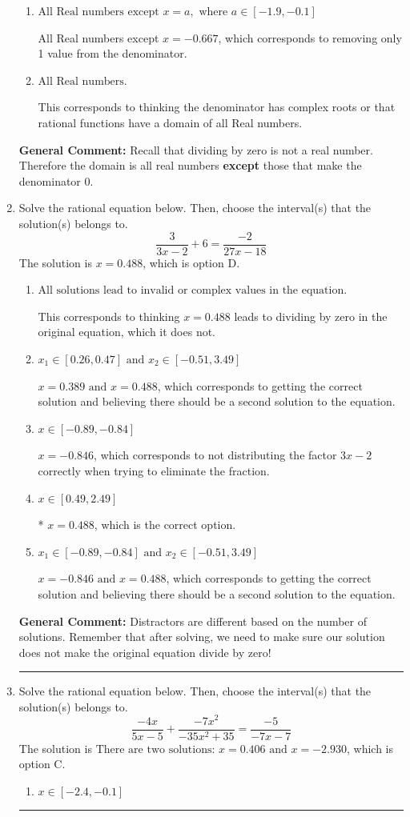 \documentclass{extbook}[14pt]
\newcommand{\litem}[1]{\item #1

\rule{\textwidth}{0.4pt}}
\begin{document}
\begin{enumerate}
{\begin{enumerate}[label=\Alph*.]
All Real numbers except $x = -24.000$, which corresponds to removing a distractor value from the denominator.
\item \( \text{All Real numbers except } x = a, \text{ where } a \in [-1.9, -0.1] \)

All Real numbers except $x = -0.667$, which corresponds to removing only 1 value from the denominator.
\item \( \text{All Real numbers.} \)

This corresponds to thinking the denominator has complex roots or that rational functions have a domain of all Real numbers.
\end{enumerate}

\textbf{General Comment:} Recall that dividing by zero is not a real number. Therefore the domain is all real numbers \textbf{except} those that make the denominator 0.
}
\litem{
Solve the rational equation below. Then, choose the interval(s) that the solution(s) belongs to.
\[ \frac{3}{3x -2} + 6 = \frac{-2}{27x -18} \]The solution is \( x = 0.488 \), which is option D.\begin{enumerate}[label=\Alph*.]
\item \( \text{All solutions lead to invalid or complex values in the equation.} \)

This corresponds to thinking $x = 0.488$ leads to dividing by zero in the original equation, which it does not.
\item \( x_1 \in [0.26, 0.47] \text{ and } x_2 \in [-0.51,3.49] \)

$x = 0.389 \text{ and } x = 0.488$, which corresponds to getting the correct solution and believing there should be a second solution to the equation.
\item \( x \in [-0.89,-0.84] \)

$x = -0.846$, which corresponds to not distributing the factor $3x -2$ correctly when trying to eliminate the fraction.
\item \( x \in [0.49,2.49] \)

* $x = 0.488$, which is the correct option.
\item \( x_1 \in [-0.89, -0.84] \text{ and } x_2 \in [-0.51,3.49] \)

$x = -0.846 \text{ and } x = 0.488$, which corresponds to getting the correct solution and believing there should be a second solution to the equation.
\end{enumerate}

\textbf{General Comment:} Distractors are different based on the number of solutions. Remember that after solving, we need to make sure our solution does not make the original equation divide by zero!
}
\litem{
Solve the rational equation below. Then, choose the interval(s) that the solution(s) belongs to.
\[ \frac{-4x}{5x -5} + \frac{-7x^{2}}{-35x^{2} + 35} = \frac{-5}{-7x -7} \]The solution is \( \text{There are two solutions: } x = 0.406 \text{ and } x = -2.930 \), which is option C.\begin{enumerate}[label=\Alph*.]
\item \( x \in [-2.4,-0.1] \)



\end{enumerate}}
\end{enumerate}
\end{document}
